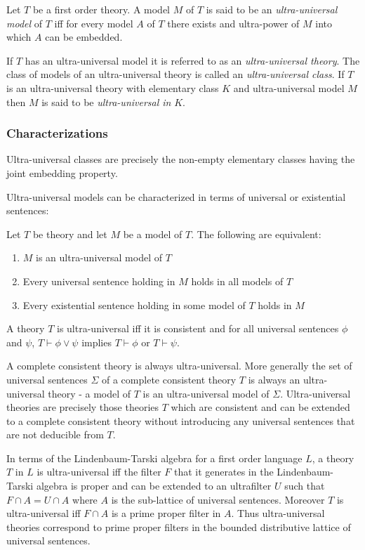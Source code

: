 \documentclass[12pt]{article}
\begin{document}
Let $T$ be a first order theory. A model $M$ of $T$ is said to be an \emph{ultra-universal model} of $T$ iff for every model $A$ of $T$ there exists and ultra-power of $M$ into which $A$ can be embedded. \cite{VC, UM}

If $T$ has an ultra-universal model it is referred to as an \emph{ultra-universal theory}. The class of models of an ultra-universal theory is called an \emph{ultra-universal class}. If $T$ is an ultra-universal theory with elementary class $K$ and ultra-universal model $M$ then $M$ is said to be \emph{ultra-universal in} $K$. \cite{UM}

\subsubsection{Characterizations}

Ultra-universal classes are precisely the non-empty elementary classes having the joint embedding property. \cite{UM}

Ultra-universal models can be characterized in terms of universal or existential sentences:

Let $T$ be theory and let $M$ be a model of $T$. The following are equivalent: \cite{UM}

\begin{enumerate}
\item $M$ is an ultra-universal model of $T$
\item Every universal sentence holding in $M$ holds in all models of $T$
\item Every existential sentence holding in some model of $T$ holds in $M$
\end{enumerate}

A theory $T$ is ultra-universal iff it is consistent and for all universal sentences $\phi$ and $\psi$, $T\vdash\phi\vee\psi$ implies $T\vdash\phi$ or $T\vdash\psi$. \cite{UM}

A complete consistent theory is always ultra-universal. More generally the set of universal sentences $\Sigma$ of a complete consistent theory $T$ is always an ultra-universal theory - a model of $T$ is an ultra-universal model of $\Sigma$. Ultra-universal theories are precisely those theories $T$ which are consistent and can be extended to a complete consistent theory without introducing any universal sentences that are not deducible from $T$. \cite{UM}

In terms of the Lindenbaum-Tarski algebra for a first order language $L$, a theory $T$ in $L$ is ultra-universal iff the filter $F$ that it generates in the Lindenbaum-Tarski algebra is proper and can be extended to an ultrafilter $U$ such that $F \cap A = U \cap A$ where $A$ is the sub-lattice of universal sentences. Moreover $T$ is ultra-universal iff $F \cap A$ is a prime proper filter in $A$. Thus ultra-universal theories correspond to prime proper filters in the bounded distributive lattice of universal sentences. \cite{UM}
\end{document}
